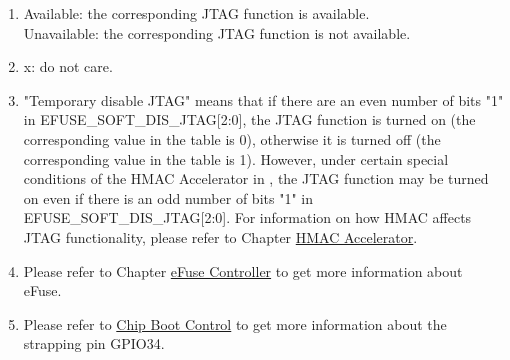 \begin{tiplisting}
\vspace{-2em}
\begin{enumerate}
\item \label{JTAG footnote: 1}
    Available: the corresponding JTAG function is available. \\
    Unavailable: the corresponding JTAG function is not available.
\item \label{JTAG footnote: 2}
    x: do not care.
\item \label{JTAG footnote: 3}
    "Temporary disable JTAG"  means that if there are an even number of bits "1" in EFUSE\_SOFT\_DIS\_JTAG[2:0], the JTAG function is turned on (the corresponding value in the table is 0), otherwise it is turned off (the corresponding value in the table is 1). However, under certain special conditions of the HMAC Accelerator in \chipname{}, the JTAG function may be turned on even if there is an odd number of bits "1" in EFUSE\_SOFT\_DIS\_JTAG[2:0].
    For information on how HMAC affects JTAG functionality, please refer to Chapter \hyperref[mod:hmac]{HMAC Accelerator}.
\item \label{JTAG footnote: 4}
    Please refer to Chapter \hyperref[mod:efuse]{eFuse Controller} to get more information about eFuse.
\item \label{JTAG footnote: 5}
    Please refer to \hyperref[mod:bootctrl]{Chip Boot Control} to get more information about the strapping pin GPIO34.
\end{enumerate}
\end{tiplisting}
